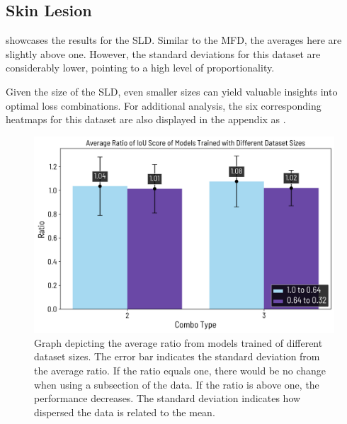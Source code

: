 \subsection{Skin Lesion}
 showcases the results for the \ac{SLD}. Similar to the \ac{MFD}, the averages here are slightly above one. However, the standard deviations for this dataset are considerably lower, pointing to a high level of proportionality. 

Given the size of the \ac{SLD}, even smaller sizes can yield valuable insights into optimal loss combinations. For additional analysis, the six corresponding heatmaps for this dataset are also displayed in the appendix as .
\begin{figure}[H]%
  \centering
  \includegraphics[width=\imgWidthM]{images/3_ratio_ablation_summary_melanoma.png}
  \caption[Ratio of IoU computed on different dataset sizes (Skin Lesion)]{Graph depicting the average ratio from models trained of different dataset sizes. The error bar indicates the standard deviation from the average ratio. If the ratio equals one, there would be no change when using a subsection of the data. If the ratio is above one, the performance decreases. The standard deviation indicates how dispersed the data is related to the mean.}
  \label{ablation_graph_skin_lesion}
\end{figure}